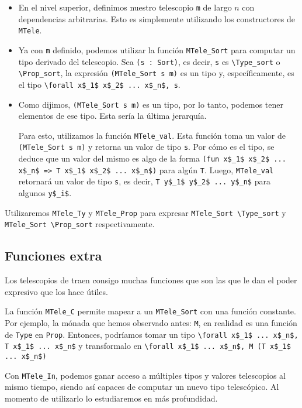 \begin{itemize}
  \item En el nivel superior, definimos nuestro telescopio \lstinline{m} de largo $n$ con dependencias arbitrarias. Esto es simplemente utilizando los constructores de \lstinline{MTele}.
  \item Ya con \lstinline{m} definido, podemos utilizar la función \lstinline{MTele_Sort} para computar un tipo derivado del telescopio. Sea \lstinline{(s : Sort)}, es decir, \lstinline{s} es \lstinline{\Type_sort} o \lstinline{\Prop_sort}, la expresión \lstinline{(MTele_Sort s m)} es un tipo y, específicamente, es el tipo \lstinline{\forall x$_1$ x$_2$ ... x$_n$, s}.
  \item Como dijimos, \lstinline{(MTele_Sort s m)} es un tipo, por lo tanto, podemos tener elementos de ese tipo. Esta sería la última jerarquía.
  
  Para esto, utilizamos la función \lstinline{MTele_val}. Esta función toma un valor de \lstinline{(MTele_Sort s m)} y retorna un valor de tipo \lstinline{s}. Por cómo es el tipo, se deduce que un valor del mismo es algo de la forma \lstinline{(fun x$_1$ x$_2$ ... x$_n$ => T x$_1$ x$_2$ ... x$_n$)} para algún \lstinline{T}. Luego, \lstinline{MTele_val} retornará un valor de tipo \lstinline{s}, es decir, \lstinline{T y$_1$ y$_2$ ... y$_n$} para algunos \lstinline{y$_i$}.
\end{itemize}

Utilizaremos \lstinline{MTele_Ty} y \lstinline{MTele_Prop} para expresar \lstinline{MTele_Sort \Type_sort} y \lstinline{MTele_Sort \Prop_sort} respectivamente.

\subsection{Funciones extra}

Los telescopios de \Mtac traen consigo muchas funciones que son las que le dan el poder expresivo que los hace útiles. 

La función \lstinline{MTele_C} permite mapear a un \lstinline{MTele_Sort} con una función constante.
Por ejemplo, la mónada que hemos observado antes: \lstinline{M}, en realidad es una función de \lstinline{Type} en \lstinline{Prop}.
Entonces, podríamos tomar un tipo \lstinline{\forall x$_1$ ... x$_n$, T x$_1$ ... x$_n$} y transformalo en \lstinline{\forall x$_1$ ... x$_n$, M (T x$_1$ ... x$_n$)}

Con \lstinline{MTele_In}, podemos ganar acceso a múltiples tipos y valores telescopios al mismo tiempo, siendo así capaces de computar un nuevo tipo telescópico.
Al momento de utilizarlo lo estudiaremos en más profundidad.

